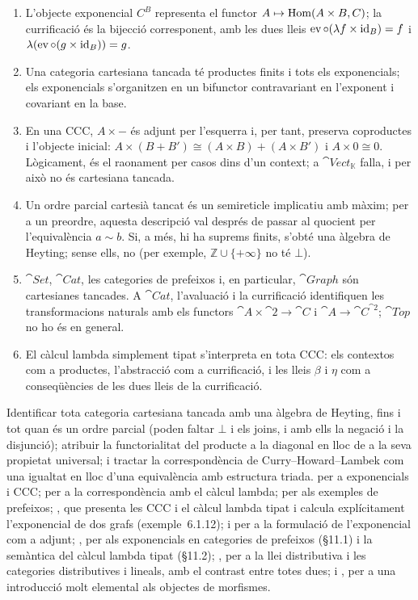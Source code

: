 \begin{resumcap}
\begin{enumerate}
  \item L'objecte exponencial $C^{B}$ representa el functor $A\mapsto\operatorname{Hom}(A\times B,C)$; la currificació és la bijecció corresponent, amb les dues lleis $\operatorname{ev}\circ(\lambda f\times\operatorname{id}_B)=f$ i $\lambda(\operatorname{ev}\circ(g\times\operatorname{id}_B))=g$.
  \item Una categoria cartesiana tancada té productes finits i tots els exponencials; els exponencials s'organitzen en un bifunctor contravariant en l'exponent i covariant en la base.
  \item En una CCC, $A\times-$ és adjunt per l'esquerra i, per tant, preserva coproductes i l'objecte inicial: $A\times(B+B')\cong(A\times B)+(A\times B')$ i $A\times 0\cong 0$. Lògicament, és el raonament per casos dins d'un context; a $\cat{Vect}_{\mathbb K}$ falla, i per això no és cartesiana tancada.
  \item Un ordre parcial cartesià tancat és un semireticle implicatiu amb màxim; per a un preordre, aquesta descripció val després de passar al quocient per l'equivalència $a\sim b$. Si, a més, hi ha suprems finits, s'obté una àlgebra de Heyting; sense ells, no (per exemple, $\mathbb Z\cup\{+\infty\}$ no té $\bot$).
  \item $\cat{Set}$, $\cat{Cat}$, les categories de prefeixos i, en particular, $\cat{Graph}$ són cartesianes tancades. A $\cat{Cat}$, l'avaluació i la currificació identifiquen les transformacions naturals amb els functors $\cat{A}\times\cat{2}\to\cat{C}$ i $\cat{A}\to\cat{C}^{\cat{2}}$; $\cat{Top}$ no ho és en general.
  \item El càlcul lambda simplement tipat s'interpreta en tota CCC: els contextos com a productes, l'abstracció com a currificació, i les lleis $\beta$ i $\eta$ com a conseqüències de les dues lleis de la currificació.
\end{enumerate}
 Identificar tota categoria cartesiana tancada amb una àlgebra de Heyting, fins i tot quan és un ordre parcial (poden faltar $\bot$ i els joins, i amb ells la negació i la disjunció); atribuir la functorialitat del producte a la diagonal en lloc de a la seva propietat universal; i tractar la correspondència de Curry--Howard--Lambek com una igualtat en lloc d'una equivalència amb estructura triada.
 \cite[cap.~6]{awodey} per a exponencials i CCC; \cite{lambekscott} per a la correspondència amb el càlcul lambda; \cite[cap.~1]{maclanemoerdijk} per als exemples de prefeixos; \cite[cap.~6]{barrwells}, que presenta les CCC i el càlcul lambda tipat i calcula explícitament l'exponencial de dos grafs (exemple~6.1.12); i \cite[§4.3]{riehl} per a la formulació de l'exponencial com a adjunt; \cite[§11]{streicher}, per als exponencials en categories de prefeixos (§11.1) i la semàntica del càlcul lambda tipat (§11.2); \cite[part~IV, sessions~25--26]{lawvereschanuel}, per a la llei distributiva i les categories distributives i lineals, amb el contrast entre totes dues; i \cite[article~V, sessions~30--31]{lawvereschanuel}, per a una introducció molt elemental als objectes de morfismes.
\end{resumcap}
